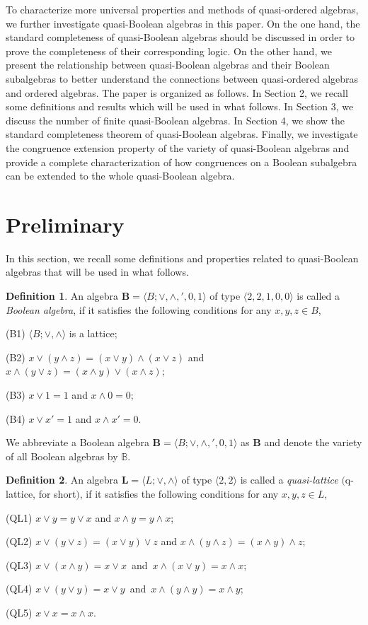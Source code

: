 \documentclass[12pt]{amsart}
\theoremstyle{definition}
\newtheorem{definition}{Definition}[section]
\theoremstyle{remark}
\numberwithin{equation}{section}
\begin{document}
To characterize more universal properties and methods of quasi-ordered algebras, we further investigate quasi-Boolean algebras in this paper. On the one hand, the standard completeness of quasi-Boolean algebras should be discussed in order to prove the completeness of their corresponding logic. On the other hand, we present the relationship between quasi-Boolean algebras and their Boolean subalgebras to better understand the connections between quasi-ordered algebras and ordered algebras.
The paper is organized as follows. In Section 2, we recall some definitions and results which will be used in what follows. In Section 3, we discuss the number of finite quasi-Boolean algebras. In Section 4, we show the standard completeness theorem of quasi-Boolean algebras. Finally, we investigate the congruence extension property of the variety of quasi-Boolean algebras and provide a complete characterization of how congruences on a Boolean subalgebra can be extended to the whole quasi-Boolean algebra.
\section{Preliminary}
In this section, we recall some definitions and properties related to quasi-Boolean algebras that will be used in what follows.

\begin{definition}\label{Boolean}\cite{Boolean algebra}
An algebra $\mathbf{B}=\langle B ; \vee ,\wedge ,' ,0, 1 \rangle$ of type $\langle 2,2,1,0,0\rangle $ is called a \emph{Boolean algebra},
if it satisfies the following conditions for any $x,y,z\in B$,

(B1) $\langle B;\vee,\wedge\rangle $ is a lattice;

(B2) $x\vee (y\wedge z)=(x \vee y)\wedge (x\vee z)$ and $x\wedge (y\vee z)=(x \wedge y)\vee (x\wedge z)$;

(B3) $x\vee 1=1$ and $x\wedge 0=0$;

(B4) $x\vee x'=1$ and $x\wedge x'=0$.
\end{definition}

We abbreviate a Boolean algebra $\mathbf{B}=\langle B;\vee,\wedge,', 0,1 \rangle$ as $\mathbf{B}$ and denote the variety of all Boolean algebras by $\mathbb{B}$.

\begin{definition}\label{Definition 1}\cite{q-lattice}
An algebra $\mathbf{L}= \langle L ; \vee ,\wedge\rangle$ of type $\langle 2,2\rangle $ is called a \emph{quasi-lattice} $\mathbf{(}$q-lattice, for short$\mathbf{)}$,
if it satisfies the following conditions for any $x,y,z\in L$,

(QL1) $x\vee y=y\vee x$ and $x\wedge y=y\wedge x$;

(QL2) $x\vee (y\vee z)=(x \vee y) \vee z$ and $x\wedge (y\wedge z)=(x \wedge y)\wedge z$;

(QL3) $x\vee (x\wedge y)=x\vee x$ \,and\, $x\wedge (x\vee y)=x\wedge x$;

(QL4) $x\vee (y\vee y)=x\vee y$ \,and\, $x\wedge (y\wedge y)=x\wedge y$;

(QL5) $x\vee x=x\wedge x$.
\end{definition}
\end{document}
